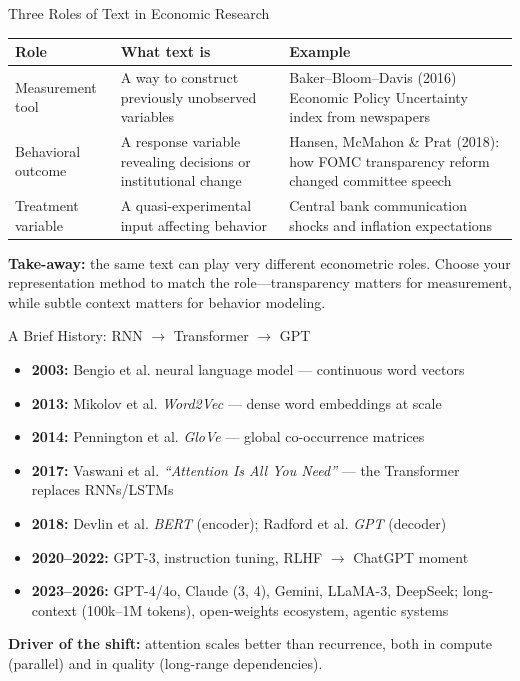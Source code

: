\documentclass[10pt,english,aspectratio=169]{beamer}
\begin{document}
\begin{frame}{Three Roles of Text in Economic Research}
\begin{center}
\renewcommand{\arraystretch}{1.35}
\begin{tabular}{l p{4cm} p{6cm}}
\toprule
\textbf{Role} & \textbf{What text is} & \textbf{Example} \\
\midrule
Measurement tool & A way to construct previously unobserved variables & Baker--Bloom--Davis (2016) Economic Policy Uncertainty index from newspapers \\
Behavioral outcome & A response variable revealing decisions or institutional change & Hansen, McMahon \& Prat (2018): how FOMC transparency reform changed committee speech \\
Treatment variable & A quasi-experimental input affecting behavior & Central bank communication shocks and inflation expectations \\
\bottomrule
\end{tabular}
\end{center}

\medskip
\textbf{Take-away:} the same text can play very different econometric roles. Choose your representation method to match the role---transparency matters for measurement, while subtle context matters for behavior modeling.
\end{frame}

\begin{frame}{A Brief History: RNN $\rightarrow$ Transformer $\rightarrow$ GPT}
\begin{itemize}
\item \textbf{2003:} Bengio et al. neural language model --- continuous word vectors
\medskip
\item \textbf{2013:} Mikolov et al. \emph{Word2Vec} --- dense word embeddings at scale
\medskip
\item \textbf{2014:} Pennington et al. \emph{GloVe} --- global co-occurrence matrices
\medskip
\item \textbf{2017:} Vaswani et al. \emph{``Attention Is All You Need''} --- the Transformer replaces RNNs/LSTMs
\medskip
\item \textbf{2018:} Devlin et al. \emph{BERT} (encoder); Radford et al. \emph{GPT} (decoder)
\medskip
\item \textbf{2020--2022:} GPT-3, instruction tuning, RLHF $\rightarrow$ ChatGPT moment
\medskip
\item \textbf{2023--2026:} GPT-4/4o, Claude (3, 4), Gemini, LLaMA-3, DeepSeek; long-context (100k--1M tokens), open-weights ecosystem, agentic systems
\end{itemize}

\medskip
\textbf{Driver of the shift:} attention scales better than recurrence, both in compute (parallel) and in quality (long-range dependencies).
\end{frame}
\end{document}
